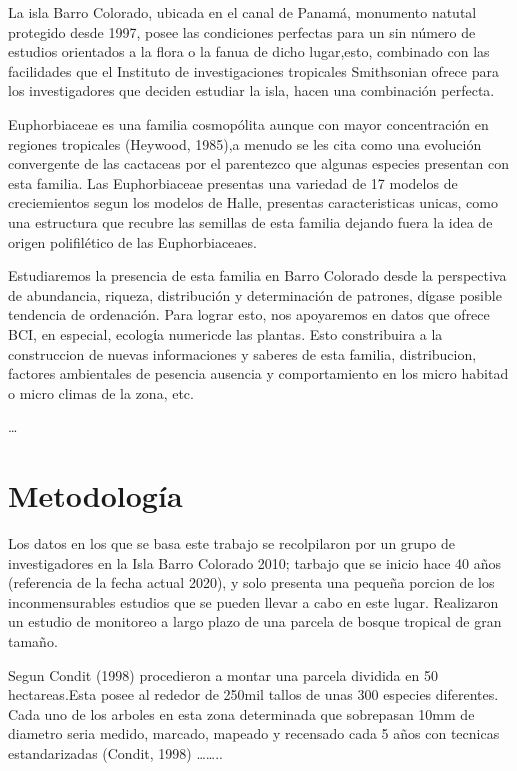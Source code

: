 \documentclass[11pt,]{article}
\begin{document}
La isla Barro Colorado, ubicada en el canal de Panamá, monumento natutal
protegido desde 1997, posee las condiciones perfectas para un sin número
de estudios orientados a la flora o la fanua de dicho lugar,esto,
combinado con las facilidades que el Instituto de investigaciones
tropicales Smithsonian ofrece para los investigadores que deciden
estudiar la isla, hacen una combinación perfecta.

Euphorbiaceae es una familia cosmopólita aunque con mayor concentración
en regiones tropicales (Heywood, 1985),a menudo se les cita como una
evolución convergente de las cactaceas por el parentezco que algunas
especies presentan con esta familia. Las Euphorbiaceae presentas una
variedad de 17 modelos de creciemientos segun los modelos de Halle,
presentas caracteristicas unicas, como una estructura que recubre las
semillas de esta familia dejando fuera la idea de origen polifilético de
las Euphorbiaceaes.

Estudiaremos la presencia de esta familia en Barro Colorado desde la
perspectiva de abundancia, riqueza, distribución y determinación de
patrones, dίgase posible tendencia de ordenación. Para lograr esto, nos
apoyaremos en datos que ofrece BCI, en especial, ecologίa numericde las
plantas. Esto constribuira a la construccion de nuevas informaciones y
saberes de esta familia, distribucion, factores ambientales de pesencia
ausencia y comportamiento en los micro habitad o micro climas de la
zona, etc.

\ldots

\section{Metodología}\label{metodologuxeda}

Los datos en los que se basa este trabajo se recolpilaron por un grupo
de investigadores en la Isla Barro Colorado 2010; tarbajo que se inicio
hace 40 años (referencia de la fecha actual 2020), y solo presenta una
pequeña porcion de los inconmensurables estudios que se pueden llevar a
cabo en este lugar. Realizaron un estudio de monitoreo a largo plazo de
una parcela de bosque tropical de gran tamaño.

Segun Condit (1998) procedieron a montar una parcela dividida en 50
hectareas.Esta posee al rededor de 250mil tallos de unas 300 especies
diferentes. Cada uno de los arboles en esta zona determinada que
sobrepasan 10mm de diametro seria medido, marcado, mapeado y recensado
cada 5 años con tecnicas estandarizadas (Condit, 1998)
\ldots{}\ldots{}..
\end{document}

